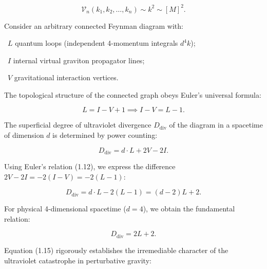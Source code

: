 \begin{equation}\label{eq:1.11}\tag{1.11}
\mathcal{V}_n(k_1, k_2, \dots, k_n) \sim k^2 \sim [M]^2.
\end{equation}

Consider an arbitrary connected Feynman diagram with:

\textbullet~$L$ quantum loops (independent 4-momentum integrals $d^4k$);

\textbullet~$I$ internal virtual graviton propagator lines;

\textbullet~$V$ gravitational interaction vertices.

The topological structure of the connected graph obeys Euler's universal formula:

\begin{equation}\label{eq:1.12}\tag{1.12}
L = I - V + 1 \implies I - V = L - 1.
\end{equation}

The superficial degree of ultraviolet divergence $D_{\text{div}}$ of the diagram in a spacetime of dimension $d$ is determined by power counting:

\begin{equation}\label{eq:1.13}\tag{1.13}
D_{\text{div}} = d \cdot L + 2V - 2I.
\end{equation}

Using Euler's relation (1.12), we express the difference $2V - 2I = -2(I - V) = -2(L - 1)$:

\begin{equation}\label{eq:1.14}\tag{1.14}
D_{\text{div}} = d \cdot L - 2(L - 1) = (d - 2) L + 2.
\end{equation}

For physical 4-dimensional spacetime ($d = 4$), we obtain the fundamental relation:

\begin{equation}\label{eq:1.15}\tag{1.15}
D_{\text{div}} = 2L + 2.
\end{equation}

Equation (1.15) rigorously establishes the irremediable character of the ultraviolet catastrophe in perturbative gravity:

